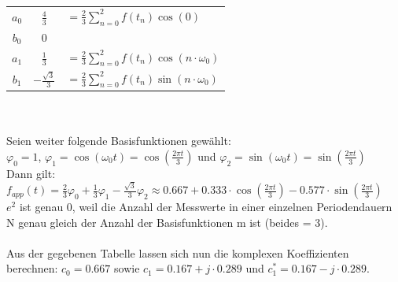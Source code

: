 		\begin{tabular}{c | c l}
			$a_0$ & $\frac{4}{3}$			&$= \frac{2}{3}\sum_{n=0}^2f(t_n)\cos\left(0\right)$\\
			$b_0$ & $0$ & \\
			$a_1$ & $\frac{1}{3}$			&$= \frac{2}{3}\sum_{n=0}^2f(t_n)\cos\left(n\cdot \omega_0\right)$\\
			$b_1$ & $-\frac{\sqrt{3}}{3}$	&$= \frac{2}{3}\sum_{n=0}^2f(t_n)\sin\left(n\cdot \omega_0\right)$
		\end{tabular}\\
		\\
		Seien weiter folgende Basisfunktionen gewählt:\\
		$\varphi _0 = 1$, $\varphi _1 = \cos(\omega _0t) = \cos\left(\frac{2\pi t}{3}\right)$ und  $\varphi _2 = \sin(\omega _0t) = \sin\left(\frac{2\pi t}{3}\right)$\\
		Dann gilt:
		$f_{app}(t) = \frac{2}{3}\varphi_0 + \frac{1}{3}\varphi_1 - \frac{\sqrt{3}}{3}\varphi_2 \approx 0.667 + 0.333\cdot \cos\left(\frac{2\pi t}{3}\right) - 0.577\cdot \sin\left(\frac{2\pi t}{3}\right)$\\
		$e^2$ ist genau 0, weil die Anzahl der Messwerte in einer einzelnen Periodendauern N genau gleich der Anzahl der Basisfunktionen m ist (beides = 3).\\
		\\
		Aus der gegebenen Tabelle lassen sich nun die komplexen Koeffizienten berechnen: $c_0 = 0.667$ sowie $c_1 = 0.167 + j\cdot 0.289$ und $c_1^* = 0.167 - j\cdot 0.289$.\\
